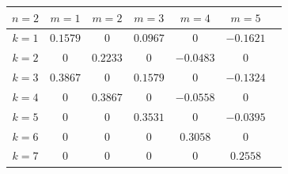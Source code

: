 \begin{table}[h]
\begin{center}
\begin{minipage}{.8\textwidth}
\begin{tabular}{|c||c|c|c|c|c|c|}
\hline







\hline

$n=2$ & $m=1$ & $m=2$ & $m=3$ & $m=4$ & $m=5$  \\

\hline

\hline

$k=1$ & $0.1579$ & $0$ & $0.0967$ & $0$ & $-0.1621$\\

\hline

$k=2$ & $0$ & $0.2233$ & $0$ & $-0.0483$ & $0$\\

\hline

$k=3$ & $0.3867$ & $0$ & $0.1579$ & $0$ & $-0.1324$\\

\hline

$k=4$ & $0$ & $0.3867$ & $0$ & $-0.0558$ & $0$\\

\hline

$k=5$ & $0$ & $0$ & $0.3531$ & $0$ & $-0.0395$\\

\hline

$k=6$ & $0$ & $0$ & $0$ & $0.3058$ & $0$\\

\hline

$k=7$ & $0$ & $0$ & $0$ & $0$ & $0.2558$\\

\hline

\end{tabular}

\end{minipage}

\end{center}

\end{table}





